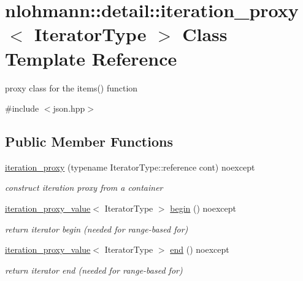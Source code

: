 \hypertarget{classnlohmann_1_1detail_1_1iteration__proxy}{}\section{nlohmann\+:\+:detail\+:\+:iteration\+\_\+proxy$<$ Iterator\+Type $>$ Class Template Reference}
\label{classnlohmann_1_1detail_1_1iteration__proxy}


proxy class for the items() function  




{\ttfamily \#include $<$json.\+hpp$>$}

\subsection*{Public Member Functions}
\begin{DoxyCompactItemize}
\item 
\mbox{\label{classnlohmann_1_1detail_1_1iteration__proxy_afe257e972e3b4658ef2e355f7389d4a5}} 
\mbox{\hyperlink{classnlohmann_1_1detail_1_1iteration__proxy_afe257e972e3b4658ef2e355f7389d4a5}{iteration\+\_\+proxy}} (typename Iterator\+Type\+::reference cont) noexcept
\begin{DoxyCompactList}\small\item\em construct iteration proxy from a container \end{DoxyCompactList}\item 
\mbox{\label{classnlohmann_1_1detail_1_1iteration__proxy_a379f86709d340c4ab1995539b8af623d}} 
\mbox{\hyperlink{classnlohmann_1_1detail_1_1iteration__proxy__value}{iteration\+\_\+proxy\+\_\+value}}$<$ Iterator\+Type $>$ \mbox{\hyperlink{classnlohmann_1_1detail_1_1iteration__proxy_a379f86709d340c4ab1995539b8af623d}{begin}} () noexcept
\begin{DoxyCompactList}\small\item\em return iterator begin (needed for range-\/based for) \end{DoxyCompactList}\item 
\mbox{\label{classnlohmann_1_1detail_1_1iteration__proxy_a90091f8492d23576edef72c5e8b9d4cf}} 
\mbox{\hyperlink{classnlohmann_1_1detail_1_1iteration__proxy__value}{iteration\+\_\+proxy\+\_\+value}}$<$ Iterator\+Type $>$ \mbox{\hyperlink{classnlohmann_1_1detail_1_1iteration__proxy_a90091f8492d23576edef72c5e8b9d4cf}{end}} () noexcept
\begin{DoxyCompactList}\small\item\em return iterator end (needed for range-\/based for) \end{DoxyCompactList}\end{DoxyCompactItemize}


